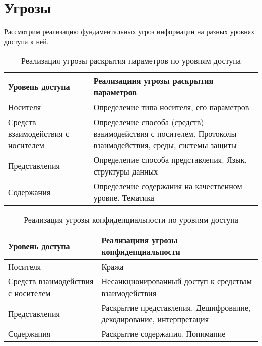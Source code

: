 \section{Угрозы}

Рассмотрим реализацию фундаментальных угроз информации на разных уровнях доступа к ней. 
\begin{table}[ht]
\caption{Реализация угрозы раскрытия параметров по уровням доступа}
\label{t:discoverThreatByLevels}
\centering
\begin{tabular}[c]{|p{5cm}|p{9cm}|}

\hline\hline
Уровень доступа&Реализациия угрозы раскрытия параметров\\ 
\hline\hline
Носителя& Определение типа носителя, его параметров\\ \hline
Средств взаимодействия с носителем& Определение способа (средств) взаимодействия с носителем. Протоколы взаимодействия, среды, системы защиты\\ \hline
Представления& Определение способа представления. Язык, структуры данных\\ \hline
Содержания& Определение содержания на качественном уровне. Тематика\\ \hline

\end{tabular}
\end{table}


\begin{table}[ht]
\caption{Реализация угрозы конфиденциальности по уровням доступа}
\label{t:confidThreatByLevels}
\centering
\begin{tabular}[c]{|p{5cm}|p{9cm}|}

\hline\hline
Уровень доступа&Реализациия угрозы конфиденциальности\\ 
\hline\hline
Носителя& Кража\\ \hline
Средств взаимодействия с носителем& Несанкционированный доступ к средствам взаимодействия\\ \hline
Представления& Раскрытие представления. Дешифрование, декодирование, интерпретация\\ \hline
Содержания& Раскрытие содержания. Понимание\\ \hline

\end{tabular}
\end{table}



